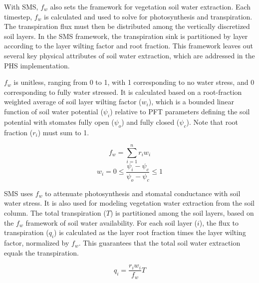 \documentclass[draft,linenumbers]{agujournal}
\begin{document}
    With SMS, $f_w$ also sets the framework for vegetation soil water extraction. 
    Each timestep, $f_w$ is calculated and used to solve for photosynthesis and transpiration.
    The transpiration flux must then be distributed among the vertically discretized soil layers.
    In the SMS framework, the transpiration sink is partitioned by layer according to the layer wilting factor and root fraction.
    This framework leaves out several key physical attributes of soil water extraction, which are addressed in the PHS implementation.
    
    $f_w$ is unitless, ranging from 0 to 1, with 1 corresponding to no water stress, and 0 corresponding to fully water stressed. 
    It is calculated based on a root-fraction weighted average of soil layer wilting factor ($w_i$), which is a bounded linear 
    function of soil water potential ($\psi_i$) relative to PFT parameters defining the soil potential with stomates fully open ($
    \psi_{o}$) and fully closed ($\psi_{c}$). Note that root fraction ($r_i$) must sum to 1.
    
    \begin{linenomath*}
    \begin{equation} f_w = \sum_{i=1}^{n}{r_iw_i}
    \label{bt:1}
    \end{equation}
    \begin{equation} 
    \label{bt:2}
    w_i=0 \leq \dfrac{\psi_i-\psi_{c}}{\psi_{o}-\psi_{c}} \leq 1
    \end{equation}
    \end{linenomath*}
    
    SMS uses $f_w$ to attenuate photosynthesis and stomatal conductance with soil water stress. 
    It is also used for modeling vegetation water extraction from the soil column. 
    The total transpiration ($T$) is partitioned among the soil layers, based on the $f_w$ framework of soil water availability. 
    For each soil layer ($i$), the flux to transpiration ($q_i$) is calculated as the layer root fraction times the layer wilting factor, normalized by $f_w$. 
    This guarantees that the total soil water extraction equals the transpiration.
    \begin{linenomath*}
    \begin{equation}
    \label{bt:4}
    q_i = \dfrac{r_i w_i}{f_w}T
    \end{equation}
    \end{linenomath*}
    
\end{document}
